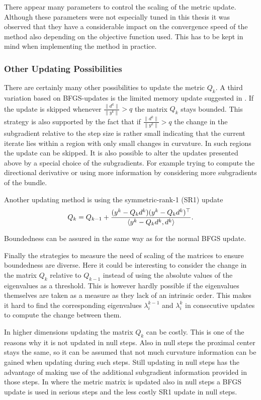 
\begin{remark}
	There appear many parameters to control the scaling of the metric update. Although these parameters were not especially tuned in this thesis it was observed that they have a considerable impact on the convergence speed of the method also depending on the objective function used. This has to be kept in mind when implementing the method in practice.
\end{remark}

\subsubsection{Other Updating Possibilities}

There are certainly many other possibilities to update the metric \(Q_k\). A third variation based on BFGS-updates is the limited memory update suggested in \cite{Nocedal1980}. If the update is skipped whenever \(\frac{\|d^k\|}{\|y^k\|}> q\) the matrix \(Q_k\) stays bounded. This strategy is also supported by the fact that if \(\frac{\|d^k\|}{\|y^k\|}> q\) the change in the subgradient relative to the step size
is rather small indicating that the current iterate lies within a region with only small changes in curvature. In such regions the update can be skipped.
It is also possible to alter the updates presented above by a special choice of the subgradients. For example trying to compute the directional derivative or using more information by considering more subgradients of the bundle.
 
Another updating method is using the symmetric-rank-1 (SR1) update
\[ Q_k = Q_{k-1}+\frac{(y^k-Q_kd^k)(y^k-Q_kd^k)^{\top}}{\left\langle y^k-Q_kd^k,d^k \right\rangle}. \]

Boundedness can be assured in the same way as for the normal BFGS update.

Finally the strategies to measure the need of scaling of the matrices to ensure boundedness are diverse. Here it could be interesting to consider the change in the matrix \(Q_k\) relative to \(Q_{k-1}\) instead of using the absolute values of the eigenvalues as a threshold.
This is however hardly possible if the eigenvalues themselves are taken as a measure as they lack of an intrinsic order. This makes it hard to find the corresponding eigenvalues \(\lambda^{k-1}_i\) and \(\lambda^k_i\) in consecutive updates to compute the change between them.

In higher dimensions updating the matrix \(Q_k\) can be costly. This is one of the reasons why it is not updated in null steps. Also in null steps the proximal center stays the same, so it can be assumed that not much curvature information can be gained when updating during such steps.
Still updating in null steps has the advantage of making use of the additional subgradient information provided in those steps.
In \cite{Haarala2007} where the metric matrix is updated also in null steps a BFGS update is used in serious steps and the less costly SR1 update in null steps.


